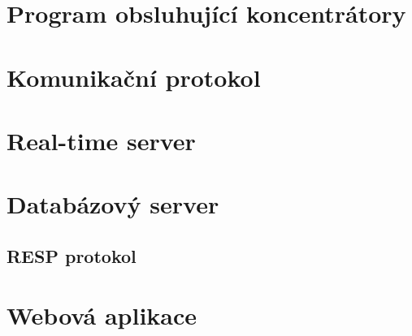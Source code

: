 \chapter{Program obsluhující koncentrátory}

\chapter{Komunikační protokol}

\chapter{Real-time server}

\chapter{Databázový server}

\section{RESP protokol}

\chapter{Webová aplikace}